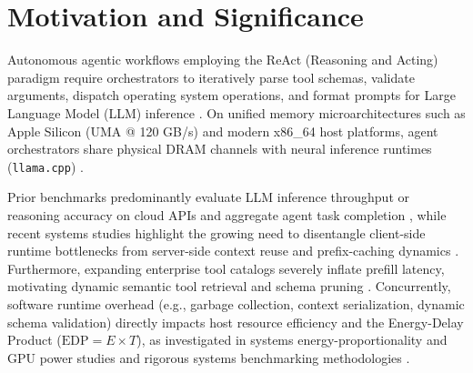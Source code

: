\documentclass[preprint,12pt,3p]{elsarticle}
\begin{document}
\section{Motivation and Significance}
\label{sec:motivation}
Autonomous agentic workflows employing the ReAct (Reasoning and Acting) paradigm \cite{yao2023react} require orchestrators to iteratively parse tool schemas, validate arguments, dispatch operating system operations, and format prompts for Large Language Model (LLM) inference \cite{yao2023react, kwon2023vllm}. On unified memory microarchitectures such as Apple Silicon (UMA @ 120 GB/s) and modern x86\_64 host platforms, agent orchestrators share physical DRAM channels with neural inference runtimes (\texttt{llama.cpp}) \cite{williams2009roofline, maricq2018taming}. 

Prior benchmarks predominantly evaluate LLM inference throughput or reasoning accuracy on cloud APIs and aggregate agent task completion \cite{reddi2020mlperf, yao2023react, zheng2023judging}, while recent systems studies highlight the growing need to disentangle client-side runtime bottlenecks from server-side context reuse and prefix-caching dynamics \cite{kwon2023vllm}. Furthermore, expanding enterprise tool catalogs severely inflate prefill latency, motivating dynamic semantic tool retrieval and schema pruning \cite{kwon2023vllm}. Concurrently, software runtime overhead (e.g., garbage collection, context serialization, dynamic schema validation) directly impacts host resource efficiency and the Energy-Delay Product ($\text{EDP} = E \times T$), as investigated in systems energy-proportionality and GPU power studies \cite{barroso2007case, you2023zeus} and rigorous systems benchmarking methodologies \cite{kalibera2013rigorous, hoefler2015scientific, maricq2018taming, kuensch1989jackknife}. 
\end{document}
